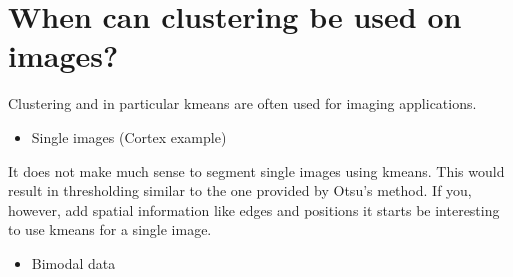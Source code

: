 \documentclass[letterpaper,10pt,english]{sphinxmanual}
\begin{document}
\begin{sphinxVerbatim}[commandchars=\\\{\}]
   
\PYG{p}{[}\PYG{p}{]}    
\end{sphinxVerbatim}

\noindent{}


\section{When can clustering be used on images?}
\label{\detokenize{05-AdvancedSegmentation:when-can-clustering-be-used-on-images}}
\sphinxAtStartPar
Clustering and in particular k\sphinxhyphen{}means are often used for imaging applications.
\begin{itemize}
\item {} 
\sphinxAtStartPar
Single images (Cortex example)

\end{itemize}

\sphinxAtStartPar
It does not make much sense to segment single images using k\sphinxhyphen{}means. This would result in thresholding similar to the one provided by Otsu’s method. If you, however, add spatial information like edges and positions it starts be interesting to use k\sphinxhyphen{}means for a single image.
\begin{itemize}
\item {} 
\sphinxAtStartPar
Bimodal data

\end{itemize}
\end{document}
